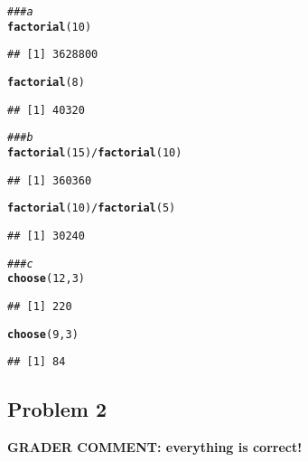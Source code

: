 \documentclass[12pt,letter]{article}\usepackage[]{graphicx}\usepackage[]{color}
\makeatletter
\newcommand{\hlnum}[1]{\textcolor[rgb]{0.686,0.059,0.569}{#1}}%
\newcommand{\hlcom}[1]{\textcolor[rgb]{0.678,0.584,0.686}{\textit{#1}}}%
\newcommand{\hlopt}[1]{\textcolor[rgb]{0,0,0}{#1}}%
\newcommand{\hlstd}[1]{\textcolor[rgb]{0.345,0.345,0.345}{#1}}%
\newcommand{\hlkwd}[1]{\textcolor[rgb]{0.737,0.353,0.396}{\textbf{#1}}}%
\newenvironment{kframe}{%
 \def\at@end@of@kframe{}%
 \ifinner\ifhmode%
  \def\at@end@of@kframe{\end{minipage}}%
  \begin{minipage}{\columnwidth}%
 \fi\fi%
 \def\FrameCommand##1{\hskip\@totalleftmargin \hskip-\fboxsep
 \colorbox{shadecolor}{##1}\hskip-\fboxsep
     \hskip-\linewidth \hskip-\@totalleftmargin \hskip\columnwidth}%
 \MakeFramed {\advance\hsize-\width
   \@totalleftmargin\z@ \linewidth\hsize
   \@setminipage}}%
 {\par\unskip\endMakeFramed%
 \at@end@of@kframe}
\newenvironment{knitrout}{}{} %
\makeatother
\begin{document}
\begin{knitrout}
\color{fgcolor}\begin{kframe}
\begin{alltt}
\hlcom{### a}
\hlkwd{factorial}\hlstd{(}\hlnum{10}\hlstd{)}
\end{alltt}
\begin{verbatim}
## [1] 3628800
\end{verbatim}
\begin{alltt}
\hlkwd{factorial}\hlstd{(}\hlnum{8}\hlstd{)}
\end{alltt}
\begin{verbatim}
## [1] 40320
\end{verbatim}
\begin{alltt}
\hlcom{### b}
\hlkwd{factorial}\hlstd{(}\hlnum{15}\hlstd{)}\hlopt{/}\hlkwd{factorial}\hlstd{(}\hlnum{10}\hlstd{)}
\end{alltt}
\begin{verbatim}
## [1] 360360
\end{verbatim}
\begin{alltt}
\hlkwd{factorial}\hlstd{(}\hlnum{10}\hlstd{)}\hlopt{/}\hlkwd{factorial}\hlstd{(}\hlnum{5}\hlstd{)}
\end{alltt}
\begin{verbatim}
## [1] 30240
\end{verbatim}
\begin{alltt}
\hlcom{### c}
\hlkwd{choose}\hlstd{(}\hlnum{12}\hlstd{,} \hlnum{3}\hlstd{)}
\end{alltt}
\begin{verbatim}
## [1] 220
\end{verbatim}
\begin{alltt}
\hlkwd{choose}\hlstd{(}\hlnum{9}\hlstd{,} \hlnum{3}\hlstd{)}
\end{alltt}
\begin{verbatim}
## [1] 84
\end{verbatim}
\end{kframe}
\end{knitrout}



\subsection*{Problem 2}

\textbf{\color{red} GRADER COMMENT: everything is correct!}
\end{document}

